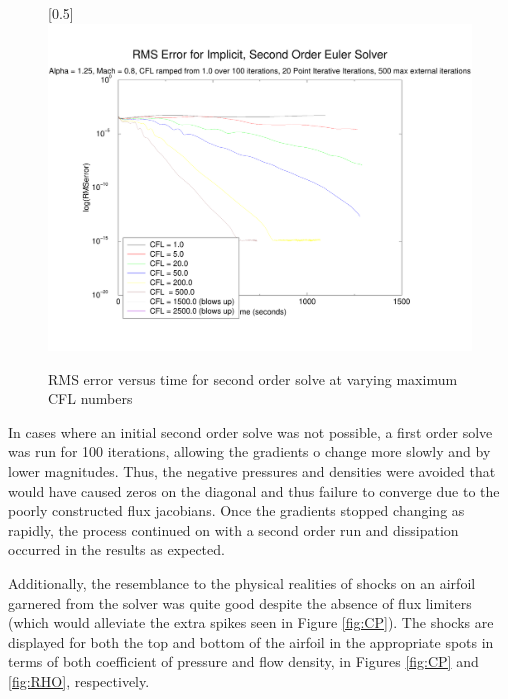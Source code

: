 \documentclass[letterpaper,twoside,11pt,openright,pdf]{book} %
\begin{document}
\begin{center}
\begin{figure}[h]
\centering
\scalebox{0.5}[0.5]{\includegraphics{RMScT.pdf}}
\caption{RMS error versus time for second order solve at varying maximum CFL numbers}
\label{fig:RMST}
\end{figure}
\end{center}

In cases where an initial second order solve was not possible, a first order solve was run for 100 iterations, allowing the gradients o change more slowly and by lower magnitudes.  Thus, the negative pressures and densities were avoided that would have caused zeros on the diagonal and thus failure to converge due to the poorly constructed flux jacobians.  Once the gradients stopped changing as rapidly, the process continued on with a second order run and dissipation occurred in the results as expected. 

Additionally, the resemblance to the physical realities of shocks on an airfoil garnered from the solver was quite good despite the absence of flux limiters (which would alleviate the extra spikes seen in Figure \ref{fig:CP}).  The shocks are displayed for both the top and bottom of the airfoil in the appropriate spots in terms of both coefficient of pressure and flow density, in Figures \ref{fig:CP} and \ref{fig:RHO}, respectively.
\end{document}
